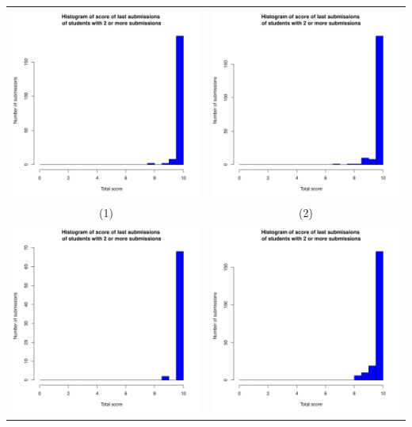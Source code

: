 \documentclass[a4paper]{article}
\theoremstyle{definition}
\begin{document}
\begin{enumerate}[a)]
\begin{itemize}
\begin{center}
\begin{tabular}{c c}
                 \includegraphics[width = 6.9cm]{Images/img12-7-1.png} & \includegraphics[width = 6.9cm]{Images/img12-7-2.png} \\
                 (1) & (2) \\
                 \includegraphics[width = 6.9cm]{Images/img12-7-3.png} &
                 \includegraphics[width = 6.9cm]{Images/img12-7-4.png} \\

\end{tabular}
\end{center}
\end{itemize}
\end{enumerate}
\end{document}
